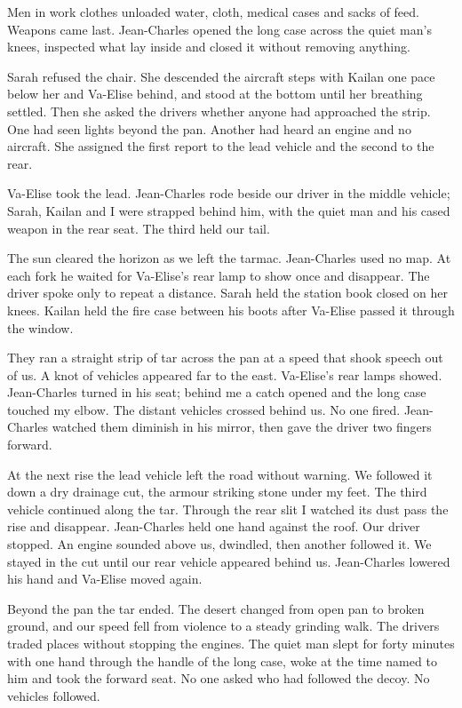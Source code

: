 Men in work clothes unloaded water, cloth, medical cases and sacks of feed. Weapons came last. Jean-Charles opened the long case across the quiet man's knees, inspected what lay inside and closed it without removing anything.\par

Sarah refused the chair. She descended the aircraft steps with Kailan one pace below her and Va-Elise behind, and stood at the bottom until her breathing settled. Then she asked the drivers whether anyone had approached the strip. One had seen lights beyond the pan. Another had heard an engine and no aircraft. She assigned the first report to the lead vehicle and the second to the rear.\par

Va-Elise took the lead. Jean-Charles rode beside our driver in the middle vehicle; Sarah, Kailan and I were strapped behind him, with the quiet man and his cased weapon in the rear seat. The third held our tail.\par

The sun cleared the horizon as we left the tarmac. Jean-Charles used no map. At each fork he waited for Va-Elise's rear lamp to show once and disappear. The driver spoke only to repeat a distance. Sarah held the station book closed on her knees. Kailan held the fire case between his boots after Va-Elise passed it through the window.\par

They ran a straight strip of tar across the pan at a speed that shook speech out of us. A knot of vehicles appeared far to the east. Va-Elise's rear lamps showed. Jean-Charles turned in his seat; behind me a catch opened and the long case touched my elbow. The distant vehicles crossed behind us. No one fired. Jean-Charles watched them diminish in his mirror, then gave the driver two fingers forward.\par

At the next rise the lead vehicle left the road without warning. We followed it down a dry drainage cut, the armour striking stone under my feet. The third vehicle continued along the tar. Through the rear slit I watched its dust pass the rise and disappear. Jean-Charles held one hand against the roof. Our driver stopped. An engine sounded above us, dwindled, then another followed it. We stayed in the cut until our rear vehicle appeared behind us. Jean-Charles lowered his hand and Va-Elise moved again.\par

Beyond the pan the tar ended. The desert changed from open pan to broken ground, and our speed fell from violence to a steady grinding walk. The drivers traded places without stopping the engines. The quiet man slept for forty minutes with one hand through the handle of the long case, woke at the time named to him and took the forward seat. No one asked who had followed the decoy. No vehicles followed.\par

